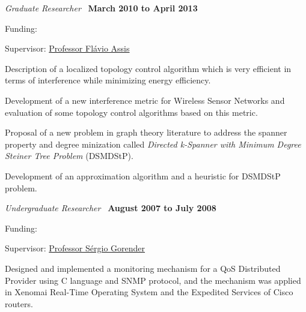 \documentclass[10pt]{article}
\let\oldcite=\cite
\renewcommand{\cite}[1]{\footnotesize{\textbf{\oldcite{#1}}}\normalsize{}}
\begin{document}
\begin{outerlist}

    \item[] \textit{Graduate Researcher}~\cite{Braga2011,Braga2012}%
            \hfill \textbf{March 2010 to April 2013}
            \begin{innerlist}
                \item Funding:~\cite{Grant2012,Grant2010}
                \item Supervisor:
                  \href{http://wiki.dcc.ufba.br/DCC/ProfFlavioAssis}
                       {Professor Fl\'{a}vio Assis}

                \item Description of a localized topology control algorithm 
                  which is very efficient in terms of interference 
                  while minimizing energy efficiency.
                  
                \item Development of a new interference metric for Wireless Sensor Networks and evaluation of 
                some topology control algorithms based on this metric.

                \item Proposal of a new problem in graph theory literature to 
address the spanner property and degree minization called 
                   \emph{Directed k-Spanner with Minimum 
                    Degree Steiner Tree Problem} (DSMDStP).
                 \item Development of an approximation algorithm and a heuristic 
				for DSMDStP problem.
            \end{innerlist}
            
		\item[] \textit{Undergraduate Researcher}~\cite{Braga2008}%
            \hfill \textbf{August 2007 to July 2008}
            \begin{innerlist}
                \item Funding:~\cite{Grant2007b}
                \item Supervisor:
                  \href{http://wiki.dcc.ufba.br/DCC/ProfSergioGorender}
                   {Professor S\'{e}rgio Gorender}
                \item Designed and implemented a monitoring mechanism for a QoS
 Distributed Provider using C language and SNMP protocol, and the mechanism was
 applied in Xenomai Real-Time Operating System and the Expedited Services of 
Cisco routers.
            \end{innerlist}

\end{outerlist}
\end{document}
